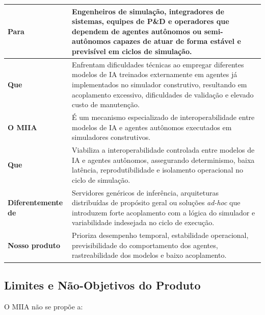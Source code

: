 \begin{table}[h]
    \begin{tabular}{|p{}|p{}|}
        \hline
            \textbf{Para} &
            Engenheiros de simulação, integradores de sistemas, equipes de P\&D e operadores que dependem de agentes autônomos ou semi-autônomos capazes de atuar de forma estável e previsível em ciclos de simulação. \\
        \hline
            \textbf{Que} &
            Enfrentam dificuldades técnicas ao empregar diferentes modelos de IA treinados externamente em agentes já implementados no simulador construtivo, resultando em acoplamento excessivo, dificuldades de validação e elevado custo de manutenção. \\
        \hline
            \textbf{O MIIA} &
            É um mecanismo especializado de interoperabilidade entre modelos de IA e agentes autônomos executados em simuladores construtivos. \\
        \hline
            \textbf{Que} &
            Viabiliza a interoperabilidade controlada entre modelos de IA e agentes autônomos, assegurando determinismo, baixa latência, reprodutibilidade e isolamento operacional no ciclo de simulação. \\
        \hline
            \textbf{Diferentemente de} &
            Servidores genéricos de inferência, arquiteturas distribuídas de propósito geral ou soluções \emph{ad-hoc} que introduzem forte acoplamento com a lógica do simulador e variabilidade indesejada no ciclo de execução. \\
        \hline
            \textbf{Nosso produto} &
           Prioriza desempenho temporal, estabilidade operacional, previsibilidade do comportamento dos agentes, rastreabilidade dos modelos e baixo acoplamento. \\
        \hline
    \end{tabular}
\end{table}

\subsection{Limites e Não-Objetivos do Produto}

O MIIA não se propõe a:

